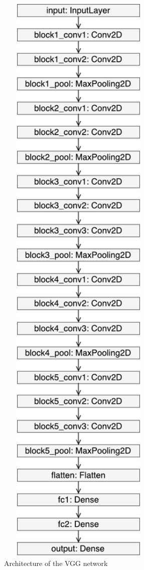 \begin{figure}
\begin{minipage}{0.4\textwidth}
            \includegraphics[width=0.7\textwidth]{fig/vgg_keras.pdf}
            \caption{Architecture of the VGG network}
            \label{vgg-architecture}
    \end{minipage}
\end{figure}

